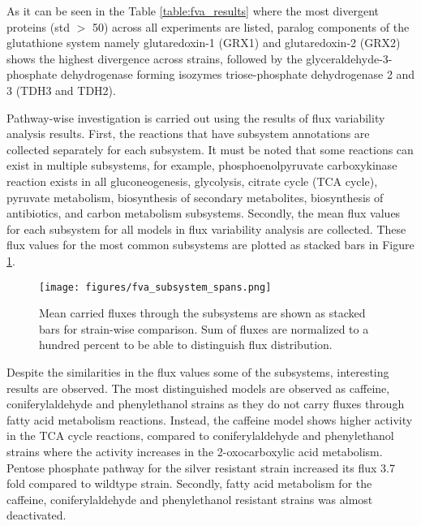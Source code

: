 As it can be seen in the Table \ref{table:fva_results} where the most divergent proteins (std $>$ 50) across all experiments are listed, paralog components of the glutathione system namely glutaredoxin-1 (GRX1) and glutaredoxin-2 (GRX2) shows the highest divergence across strains, followed by the glyceraldehyde-3-phosphate dehydrogenase forming isozymes triose-phosphate dehydrogenase 2 and 3 (TDH3 and TDH2).



Pathway-wise investigation is carried out using the results of flux variability analysis results. First, the reactions that have subsystem annotations are collected separately for each subsystem. It must be noted that some reactions can exist in multiple subsystems, for example, phosphoenolpyruvate carboxykinase reaction exists in all gluconeogenesis, glycolysis, citrate cycle (TCA cycle), pyruvate metabolism, biosynthesis of secondary metabolites, biosynthesis of antibiotics, and carbon metabolism subsystems. Secondly, the mean flux values for each subsystem for all models in flux variability analysis are collected. These flux values for the most common subsystems are plotted as stacked bars in Figure \ref{fig:fva_subsystem_spans}.

\begin{figure}[H]
  \begin{center}
  \texttt{[image: figures/fva\_subsystem\_spans.png]}
  \caption[Mean carried fluxes through the subsystems are shown as stacked bars for strain-wise comparison. Sum of fluxes are normalized to a hundred percent to be able to distinguish flux distribution]{Mean carried fluxes through the subsystems are shown as stacked bars for strain-wise comparison. Sum of fluxes are normalized to a hundred percent to be able to distinguish flux distribution.}
  \label{fig:fva_subsystem_spans}
  \end{center}
\end{figure}

Despite the similarities in the flux values some of the subsystems, interesting results are observed. The most distinguished models are observed as caffeine, coniferylaldehyde and phenylethanol strains as they do not carry fluxes through fatty acid metabolism reactions. Instead, the caffeine model shows higher activity in the TCA cycle reactions, compared to coniferylaldehyde and phenylethanol strains where the activity increases in the 2-oxocarboxylic acid metabolism. Pentose phosphate pathway for the silver resistant strain increased its flux 3.7 fold compared to wildtype strain. Secondly, fatty acid metabolism for the caffeine, coniferylaldehyde and phenylethanol resistant strains was almost deactivated.

